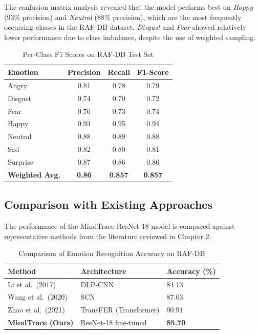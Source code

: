 The confusion matrix analysis revealed that the model performs best on
\textit{Happy} (93\% precision) and \textit{Neutral} (88\% precision),
which are the most frequently occurring classes in the RAF-DB dataset.
\textit{Disgust} and \textit{Fear} showed relatively lower performance
due to class imbalance, despite the use of weighted sampling.

\begin{table}[H]
\centering
\caption{Per-Class F1 Scores on RAF-DB Test Set}
\begin{tabular}{lccc}
\toprule
\textbf{Emotion} & \textbf{Precision} & \textbf{Recall} & \textbf{F1-Score} \\
\midrule
Angry            & 0.81               & 0.78            & 0.79 \\
Disgust          & 0.74               & 0.70            & 0.72 \\
Fear             & 0.76               & 0.73            & 0.74 \\
Happy            & 0.93               & 0.95            & 0.94 \\
Neutral          & 0.88               & 0.89            & 0.88 \\
Sad              & 0.82               & 0.80            & 0.81 \\
Surprise         & 0.87               & 0.86            & 0.86 \\
\midrule
\textbf{Weighted Avg.} & \textbf{0.86} & \textbf{0.857} & \textbf{0.857} \\
\bottomrule
\end{tabular}
\end{table}

\subsection{Comparison with Existing Approaches}

The performance of the MindTrace ResNet-18 model is compared against
representative methods from the literature reviewed in Chapter 2:

\begin{table}[H]
\centering
\caption{Comparison of Emotion Recognition Accuracy on RAF-DB}
\begin{tabular}{lll}
\toprule
\textbf{Method}                  & \textbf{Architecture}   & \textbf{Accuracy (\%)} \\
\midrule
Li et al.\ (2017)                & DLP-CNN                 & 84.13 \\
Wang et al.\ (2020)              & SCN                     & 87.03 \\
Zhao et al.\ (2021)              & TransFER (Transformer)  & 90.91 \\
\textbf{MindTrace (Ours)}        & ResNet-18 fine-tuned    & \textbf{85.70} \\
\bottomrule
\end{tabular}
\end{table}

